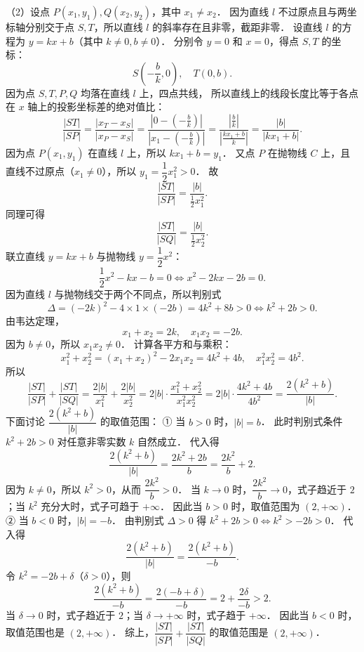 \begin{answer}
（2）设点 $P(x_1, y_1), Q(x_2, y_2)$，其中 $x_1 \neq x_2$．
因为直线 $l$ 不过原点且与两坐标轴分别交于点 $S, T$，所以直线 $l$ 的斜率存在且非零，截距非零．
设直线 $l$ 的方程为 $y = kx + b$（其中 $k \neq 0, b \neq 0$）．
分别令 $y = 0$ 和 $x = 0$，得点 $S, T$ 的坐标：
\nopagebreak[4]
\[
S\left(-\frac{b}{k}, 0\right), \quad T(0, b).
\]
因为点 $S, T, P, Q$ 均落在直线 $l$ 上，四点共线，
所以直线上的线段长度比等于各点在 $x$ 轴上的投影坐标差的绝对值比：
\nopagebreak[4]
\[
\frac{|ST|}{|SP|} = \frac{|x_T - x_S|}{|x_P - x_S|} = \frac{\left|0 - \left(-\frac{b}{k}\right)\right|}{\left|x_1 - \left(-\frac{b}{k}\right)\right|} = \frac{\left|\frac{b}{k}\right|}{\left|\frac{kx_1 + b}{k}\right|} = \frac{|b|}{|kx_1 + b|}.
\]
因为点 $P(x_1, y_1)$ 在直线 $l$ 上，所以 $kx_1 + b = y_1$．
又点 $P$ 在抛物线 $C$ 上，且直线不过原点（$x_1 \neq 0$），所以 $y_1 = \dfrac{1}{2}x_1^2 > 0$．
故
\nopagebreak[4]
\[
\frac{|ST|}{|SP|} = \frac{|b|}{\frac{1}{2}x_1^2}.
\]
同理可得
\nopagebreak[4]
\[
\frac{|ST|}{|SQ|} = \frac{|b|}{\frac{1}{2}x_2^2}.
\]
联立直线 $y = kx + b$ 与抛物线 $y = \dfrac{1}{2}x^2$：
\nopagebreak[4]
\[
\frac{1}{2}x^2 - kx - b = 0 \iff x^2 - 2kx - 2b = 0.
\]
因为直线 $l$ 与抛物线交于两个不同点，所以判别式
\nopagebreak[4]
\[
\Delta = (-2k)^2 - 4 \times 1 \times (-2b) = 4k^2 + 8b > 0 \iff k^2 + 2b > 0.
\]
由韦达定理，
\nopagebreak[4]
\[
x_1 + x_2 = 2k, \quad x_1 x_2 = -2b.
\]
因为 $b \neq 0$，所以 $x_1 x_2 \neq 0$．
计算各平方和与乘积：
\nopagebreak[4]
\[
x_1^2 + x_2^2 = (x_1 + x_2)^2 - 2x_1 x_2 = 4k^2 + 4b, \quad x_1^2 x_2^2 = 4b^2.
\]
所以
\nopagebreak[4]
\[
\frac{|ST|}{|SP|} + \frac{|ST|}{|SQ|} = \frac{2|b|}{x_1^2} + \frac{2|b|}{x_2^2} = 2|b| \cdot \frac{x_1^2 + x_2^2}{x_1^2 x_2^2} = 2|b| \cdot \frac{4k^2 + 4b}{4b^2} = \frac{2(k^2 + b)}{|b|}.
\]
下面讨论 $\dfrac{2(k^2 + b)}{|b|}$ 的取值范围：
① 当 $b > 0$ 时，$|b| = b$．
此时判别式条件 $k^2 + 2b > 0$ 对任意非零实数 $k$ 自然成立．
代入得
\nopagebreak[4]
\[
\frac{2(k^2 + b)}{|b|} = \frac{2k^2 + 2b}{b} = \frac{2k^2}{b} + 2.
\]
因为 $k \neq 0$，所以 $k^2 > 0$，从而 $\dfrac{2k^2}{b} > 0$．
当 $k \to 0$ 时，$\dfrac{2k^2}{b} \to 0$，式子趋近于 $2$；当 $k^2$ 充分大时，式子可趋于 $+\infty$．
因此当 $b > 0$ 时，取值范围为 $(2, +\infty)$．
② 当 $b < 0$ 时，$|b| = -b$．
由判别式 $\Delta > 0$ 得 $k^2 + 2b > 0 \iff k^2 > -2b > 0$．
代入得
\nopagebreak[4]
\[
\frac{2(k^2 + b)}{|b|} = \frac{2(k^2 + b)}{-b}.
\]
令 $k^2 = -2b + \delta$（$\delta > 0$），则
\nopagebreak[4]
\[
\frac{2(k^2 + b)}{-b} = \frac{2(-b + \delta)}{-b} = 2 + \frac{2\delta}{-b} > 2.
\]
当 $\delta \to 0$ 时，式子趋近于 $2$；当 $\delta \to +\infty$ 时，式子趋于 $+\infty$．
因此当 $b < 0$ 时，取值范围也是 $(2, +\infty)$．
综上，$\dfrac{|ST|}{|SP|} + \dfrac{|ST|}{|SQ|}$ 的取值范围是 $(2, +\infty)$．


\end{answer}